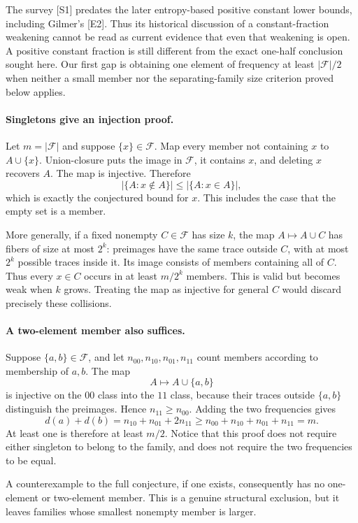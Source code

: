 \documentclass[11pt]{article}
\begin{document}
The survey [S1] predates the later entropy-based positive constant lower bounds, including Gilmer's [E2]. Thus its historical discussion of a constant-fraction weakening cannot be read as current evidence that even that weakening is open. A positive constant fraction is still different from the exact one-half conclusion sought here. Our first gap is obtaining one element of frequency at least $|\mathcal F|/2$ when neither a small member nor the separating-family size criterion proved below applies.

\paragraph{Singletons give an injection proof.}
Let $m=|\mathcal F|$ and suppose $\{x\}\in\mathcal F$. Map every member not containing $x$ to $A\cup\{x\}$. Union-closure puts the image in $\mathcal F$, it contains $x$, and deleting $x$ recovers $A$. The map is injective. Therefore
\[
 |\{A:x\notin A\}|\le|\{A:x\in A\}|,
\]
which is exactly the conjectured bound for $x$. This includes the case that the empty set is a member.

More generally, if a fixed nonempty $C\in\mathcal F$ has size $k$, the map $A\mapsto A\cup C$ has fibers of size at most $2^k$: preimages have the same trace outside $C$, with at most $2^k$ possible traces inside it. Its image consists of members containing all of $C$. Thus every $x\in C$ occurs in at least $m/2^k$ members. This is valid but becomes weak when $k$ grows. Treating the map as injective for general $C$ would discard precisely these collisions.

\paragraph{A two-element member also suffices.}
Suppose $\{a,b\}\in\mathcal F$, and let $n_{00},n_{10},n_{01},n_{11}$ count members according to membership of $a,b$. The map
\[
 A\longmapsto A\cup\{a,b\}
\]
is injective on the $00$ class into the $11$ class, because their traces outside $\{a,b\}$ distinguish the preimages. Hence $n_{11}\ge n_{00}$. Adding the two frequencies gives
\[
 d(a)+d(b)=n_{10}+n_{01}+2n_{11}
 \ge n_{00}+n_{10}+n_{01}+n_{11}=m.
\]
At least one is therefore at least $m/2$. Notice that this proof does not require either singleton to belong to the family, and does not require the two frequencies to be equal.

A counterexample to the full conjecture, if one exists, consequently has no one-element or two-element member. This is a genuine structural exclusion, but it leaves families whose smallest nonempty member is larger.
\end{document}
